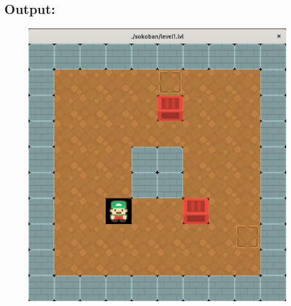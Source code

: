 \subsection{Output:}\label{sec:ps2a:output}
\begin{figure}[h]
    \centering
    \includegraphics[width=1\textwidth]{projectPictures/PS2a.png}
    \label{fig:ps2a}
\end{figure}

